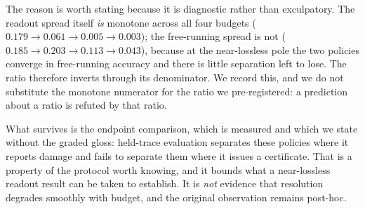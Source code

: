 \documentclass{article}
\begin{document}
The reason is worth stating because it is diagnostic rather than exculpatory. The readout spread itself \emph{is} monotone across all four budgets ($0.179 \to 0.061 \to 0.005 \to 0.003$); the free-running spread is not ($0.185 \to 0.203 \to 0.113 \to 0.043$), because at the near-lossless pole the two policies converge in free-running accuracy and there is little separation left to lose. The ratio therefore inverts through its denominator. We record this, and we do not substitute the monotone numerator for the ratio we pre-registered: a prediction about a ratio is refuted by that ratio.

What survives is the endpoint comparison, which is measured and which we state without the graded gloss: held-trace evaluation separates these policies where it reports damage and fails to separate them where it issues a certificate. That is a property of the protocol worth knowing, and it bounds what a near-lossless readout result can be taken to establish. It is \emph{not} evidence that resolution degrades smoothly with budget, and the original observation remains post-hoc.
\end{document}
